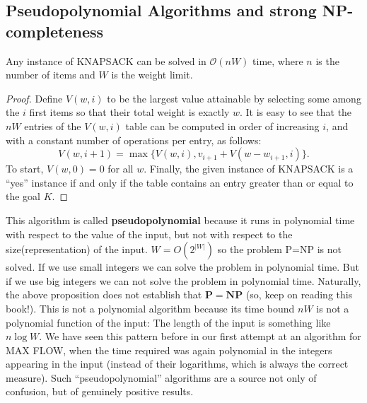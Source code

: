 \documentclass[12pt]{article}
\begin{document}
\subsection{Pseudopolynomial Algorithms and strong NP-completeness}
\begin{defbox}[Proposition]
  Any instance of \textsc{KNAPSACK} can be solved in $\mathcal{O}(nW)$ time, where $n$ is the number of items and $W$ is the weight limit.
\end{defbox}
\begin{proof}
  Define $V(w, i)$ to be the largest value attainable by selecting some among the $i$ first items so that their total weight is exactly $w$. It is easy to see that the $nW$ entries of the $V(w, i)$ table can be computed in order of increasing $i$, and with a constant number of operations per entry, as follows:
\[
V(w, i+1) = \max\{V(w, i), v_{i+1} + V(w - w_{i+1}, i)\}.
\]
To start, $V(w, 0) = 0$ for all $w$. Finally, the given instance of \textsc{KNAPSACK} is a ``yes'' instance if and only if the table contains an entry greater than or equal to the goal $K$. 
\end{proof}
This algorithm is called \textbf{pseudopolynomial} because it runs in polynomial time with respect to the value of the input, but not with respect to the size(representation) of the input. 
$W=O(2^{|W|})$ so the problem \textsc{P=NP} is not solved. If we use small integers we can solve the problem in polynomial time. But if we use big integers we can not solve the problem in polynomial time.
Naturally, the above proposition does not establish that $\mathbf{P} = \mathbf{NP}$ (so, keep on reading this book!). This is not a polynomial algorithm because its time bound $nW$ is not a polynomial function of the input: The length of the input is something like $n \log W$. We have seen this pattern before in our first attempt at an algorithm for \textsc{MAX FLOW}, when the time required was again polynomial in the integers appearing in the input (instead of their logarithms, which is always the correct measure). Such ``pseudopolynomial'' algorithms are a source not only of confusion, but of genuinely positive results.
\end{document}
